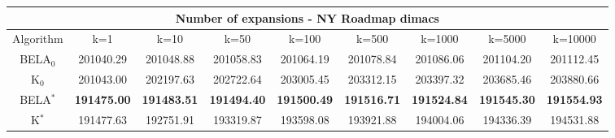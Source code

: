\begin{tabular}{c|cccccccc}\toprule
\multicolumn{9}{c}{Number of expansions - NY Roadmap dimacs}\\ \midrule
Algorithm & k=1 & k=10 & k=50 & k=100 & k=500 & k=1000 & k=5000 & k=10000 \\ \midrule
BELA$_0$ & 201040.29 & 201048.88 & 201058.83 & 201064.19 & 201078.84 & 201086.06 & 201104.20 & 201112.45 \\
K$_0$ & 201043.00 & 202197.63 & 202722.64 & 203005.45 & 203312.15 & 203397.32 & 203685.46 & 203880.66 \\
BELA$^*$ & \textbf{191475.00} & \textbf{191483.51} & \textbf{191494.40} & \textbf{191500.49} & \textbf{191516.71} & \textbf{191524.84} & \textbf{191545.30} & \textbf{191554.93} \\
K$^*$ & 191477.63 & 192751.91 & 193319.87 & 193598.08 & 193921.88 & 194004.06 & 194336.39 & 194531.88 \\ \bottomrule 
\end{tabular}
